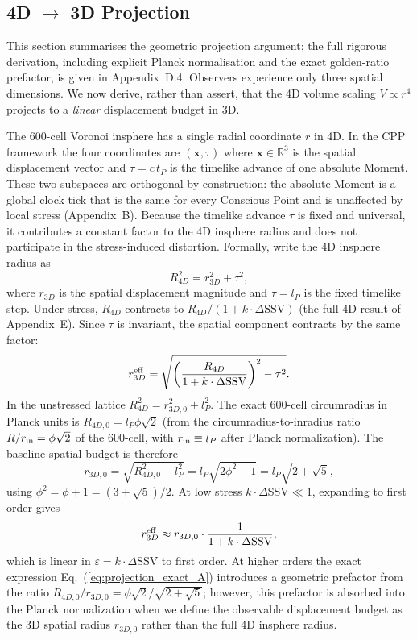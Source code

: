 \documentclass[11pt,letterpaper]{article}
\begin{document}
\subsection{4D $\to$ 3D Projection}

This section summarises the geometric projection argument; the full rigorous derivation, including explicit Planck normalisation and the exact golden-ratio prefactor, is given in Appendix~D.4. Observers experience only three spatial dimensions. We now derive, rather than assert, that the 4D volume scaling $V \propto r^4$ projects to a \emph{linear} 
displacement budget in 3D.

The 600-cell Voronoi insphere has a single radial coordinate $r$ in 4D. In the CPP framework the four coordinates are $(\mathbf{x}, \tau)$ where $\mathbf{x} \in \mathbb{R}^3$ is the spatial displacement vector and $\tau = c\,t_P$ is the 
timelike advance of one absolute Moment. These two subspaces are orthogonal by construction: the absolute Moment is a global clock tick that is the same for every Conscious Point and is unaffected by local stress (Appendix~B). Because 
the timelike advance $\tau$ is fixed and universal, it contributes a constant factor to the 4D insphere radius and does not participate in the stress-induced distortion. Formally, write the 4D insphere radius as
\begin{equation}
R_{4D}^2 = r_{3D}^2 + \tau^2,
\label{eq:4d_radius_A}
\end{equation}
where $r_{3D}$ is the spatial displacement magnitude and $\tau = l_P$ is the 
fixed timelike step. Under stress, $R_{4D}$ contracts to 
$R_{4D}/(1 + k\cdot\Delta\text{SSV})$ (the full 4D result of Appendix~E). 
Since $\tau$ is invariant, the spatial component contracts by the same factor:
\begin{equation}
r_{3D}^{\rm eff} = \sqrt{\left(\frac{R_{4D}}{1+k\cdot\Delta\text{SSV}}\right)^2 
- \tau^2}.
\label{eq:projection_exact_A}
\end{equation}
In the unstressed lattice $R_{4D}^2 = r_{3D,0}^2 + l_P^2$. The 
exact 600-cell circumradius in Planck units is $R_{4D,0} = 
l_P\phi\sqrt{2}$ (from the circumradius-to-inradius ratio 
$R/r_{\rm in} = \phi\sqrt{2}$ of the 600-cell, with 
$r_{\rm in} \equiv l_P$ after Planck normalization). The baseline 
spatial budget is therefore
\[
r_{3D,0} = \sqrt{R_{4D,0}^2 - l_P^2} = l_P\sqrt{2\phi^2 - 1} 
= l_P\sqrt{2+\sqrt{5}},
\]
using $\phi^2 = \phi + 1 = (3+\sqrt{5})/2$.
At low stress 
$k\cdot\Delta\text{SSV} \ll 1$, expanding to first order gives
\[
r_{3D}^{\rm eff} \approx r_{3D,0} \cdot \frac{1}{1 + k\cdot\Delta\text{SSV}},
\]
which is linear in $\varepsilon = k\cdot\Delta\text{SSV}$ to first 
order. At higher orders the exact expression 
Eq.~(\ref{eq:projection_exact_A}) introduces a geometric prefactor 
from the ratio $R_{4D,0}/r_{3D,0} = \phi\sqrt{2}/\sqrt{2+\sqrt{5}}$; 
however, this prefactor is absorbed into the Planck normalization 
when we define the observable displacement budget as the 3D spatial 
radius $r_{3D,0}$ rather than the full 4D insphere radius. 
\end{document}
